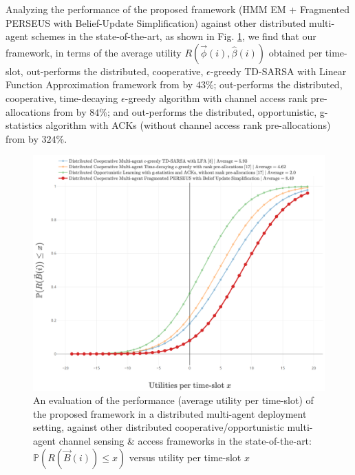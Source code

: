 \documentclass[12pt, draftcls, onecolumn]{IEEEtran}
\begin{document}
Analyzing the performance of the proposed framework (HMM EM + Fragmented PERSEUS with Belief-Update Simplification) against other distributed multi-agent schemes in the state-of-the-art, as shown in Fig. \ref{fig: Z. 2}, we find that our framework, in terms of the average utility $R(\vec{\phi}(i), \hat{\beta}(i))$ obtained per time-slot, out-performs the distributed, cooperative, $\epsilon$-greedy TD-SARSA with Linear Function Approximation framework from \cite{WCL:5} by $43$\%; out-performs the distributed, cooperative, time-decaying $\epsilon$-greedy algorithm with channel access rank pre-allocations from \cite{WCL:MIT} by $84$\%; and out-performs the distributed, opportunistic, g-statistics algorithm with ACKs (without channel access rank pre-allocations) from \cite{WCL:MIT} by $324$\%.
\begin{figure} [htb]
    \centerline{
    \includegraphics[width = 0.8\linewidth]{figures/CDF_Multi_Agent_Performance_Comparison.png}}
    \caption{An evaluation of the performance (average utility per time-slot) of the proposed framework in a distributed multi-agent deployment setting, against other distributed cooperative/opportunistic multi-agent channel sensing \& access frameworks in the state-of-the-art: $\mathbb{P}(R(\vec{B}(i)){\leq}x)$ versus utility per time-slot $x$}
    \label{fig: Z. 2}
\end{figure}
\end{document}
